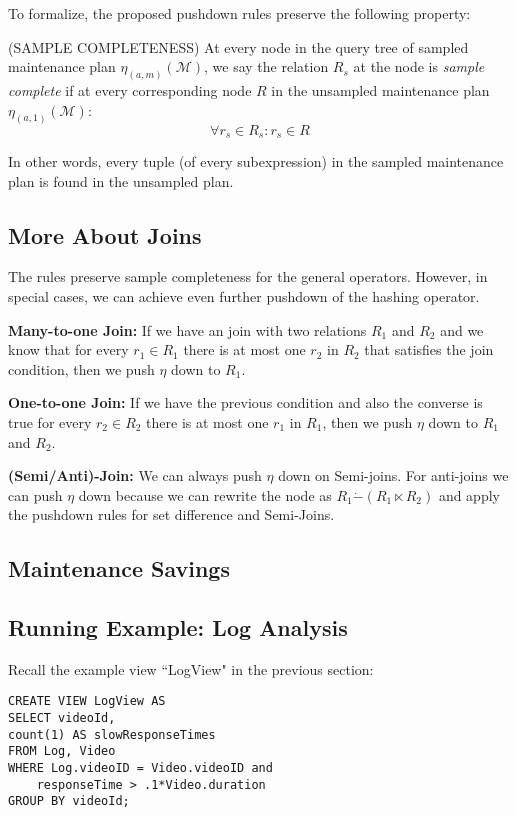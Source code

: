 To formalize, the proposed pushdown rules preserve the following property:
\begin{proposition} (SAMPLE COMPLETENESS) At every node in the query tree of sampled maintenance plan $\eta_{(a,m)}(\mathcal{M})$, we say the relation $R_s$ at the node is \emph{sample complete} if at every corresponding node $R$ in the unsampled maintenance plan $\eta_{(a,1)}(\mathcal{M})$:
\[ \forall r_s \in R_s : r_s \in R \]
\end{proposition}
In other words, every tuple (of every subexpression) in the sampled maintenance plan is found in the unsampled plan. 

\subsection{More About Joins} 
The rules preserve sample completeness for the general operators. 
However, in special cases, we can achieve even further pushdown of the hashing operator. 

\textbf{Many-to-one Join: } If we have an join with two relations $R_1$ and $R_2$ and we know that for every $r_1 \in R_1$ there is at most one $r_2$ in $R_2$ that satisfies the join condition, then we push $\eta$ down to $R_1$.

\textbf{One-to-one Join: } If we have the previous condition and also the converse is true for every $r_2 \in R_2$ there is at most one $r_1$ in $R_1$, then we push $\eta$ down to $R_1$ and $R_2$.

\textbf{(Semi/Anti)-Join: } We can always push $\eta$ down on Semi-joins. For anti-joins we can push $\eta$ down because we can rewrite the node as $R_1 \dot{-} (R_1 \ltimes R_2) $ and apply the pushdown rules for set difference and Semi-Joins.

\subsection{Maintenance Savings}

\subsection{Running Example: Log Analysis}
Recall the example view ``LogView" in the previous section:
\begin{lstlisting} 
CREATE VIEW LogView AS 
SELECT videoId, 
count(1) AS slowResponseTimes 
FROM Log, Video
WHERE Log.videoID = Video.videoID and
    responseTime > .1*Video.duration
GROUP BY videoId;
\end{lstlisting}

